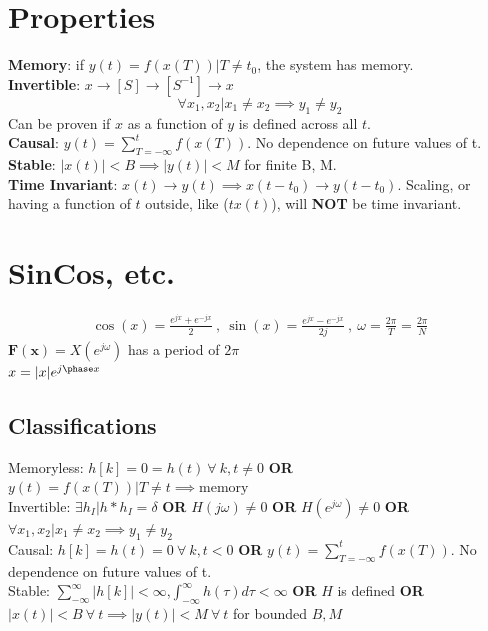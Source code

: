 \documentclass[8pt]{extarticle}
\begin{document}
\section*{Properties}
\textbf{Memory}: if $y(t) = f(x(T)) | T\neq t_0$, the system has memory.\\
\textbf{Invertible}: $x\rightarrow [S]\rightarrow [S^{-1}]\rightarrow x$
\begin{equation*}
    \forall x_1, x_2 | x_1\neq x_2 \implies y_1\neq y_2
\end{equation*}
Can be proven if $x$ as a function of $y$ is defined across all $t$.\\
\textbf{Causal}: $y(t) = \sum_{T=-\infty}^{t} f(x(T))$. No dependence on future values of t.\\
\textbf{Stable}: $|x(t)|<B \implies |y(t)|<M$ for finite B, M.\\
\textbf{Time Invariant}: $x(t) \rightarrow y(t) \implies x(t-t_0) \rightarrow y(t-t_0)$.
Scaling, or having a function of $t$ outside, like ($tx(t)$), will \textbf{NOT} be time invariant.
\section*{SinCos, etc.}
\begin{align*}
    \cos(x)=\frac{e^{jx}+e^{-jx}}{2} ~,~ \sin(x)=\frac{e^{jx}-e^{-jx}}{2j} ~,~ \omega = \frac{2\pi}{T}= \frac{2\pi}{N}
\end{align*}
$\mathbf{F(x)}=X(e^{j\omega})$ has a period of $2\pi$\\
$x = |x|e^{j\phase x}$
\subsection*{Classifications}
Memoryless: $h[k]=0=h(t)~\forall~k,t\neq 0$ \textbf{OR} $y(t) = f(x(T))|T\neq t
    \implies \text{memory}$\\ Invertible: $\exists h_I |h*h_I=\delta$ \textbf{OR}
$H(j\omega)\neq 0$ \textbf{OR} $H(e^{j\omega})\neq 0$ \textbf{OR} $\forall
    x_1,x_2|x_1\neq x_2 \implies y_1\neq y_2$\\ Causal: $h[k]=h(t)=0 ~\forall~
    k,t<0$ \textbf{OR} $y(t) = \sum_{T=-\infty}^{t} f(x(T))$. No dependence on
future values of t.\\ Stable:
$\sum_{-\infty}^{\infty}|h[k]|<\infty$,$\int_{-\infty}^{\infty}h(\tau)d\tau<\infty$
\textbf{OR} $H$ is defined \textbf{OR} $|x(t)|<B ~\forall~ t \implies |y(t)|<M
    ~\forall~ t$ for bounded $B, M$\\
\end{document}
